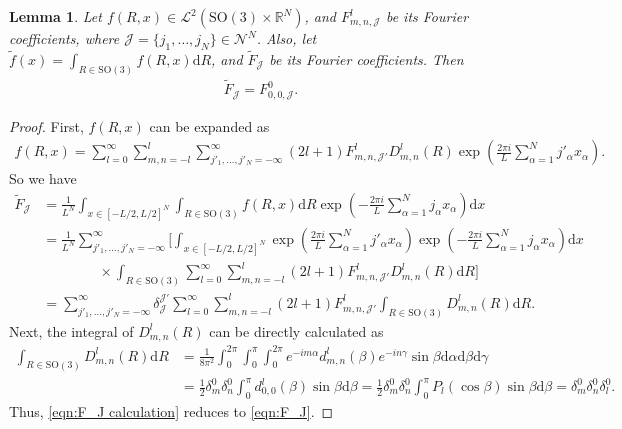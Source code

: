\documentclass[10pt]{article}
\newtheorem{lemma}{Lemma}
\newcommand{\SO}{\ensuremath{\mathrm{SO}(3)}}
\newcommand{\diff}[1]{\mathrm{d}#1}
\newcommand{\real}{\ensuremath{\mathbb{R}}}
\begin{document}
\begin{lemma} \label{lemma:marginal Fourier}
	Let $f(R,x)\in\mathcal{L}^2(\SO\times\real^N)$, and $F^l_{m,n,\mathcal{J}}$ be its Fourier coefficients, where $\mathcal{J} = \{j_1,\ldots,j_N\} \in \mathcal{N}^N$.
	Also, let $\tilde{f}(x) = \int_{R\in\SO} f(R,x) \diff{R}$, and $\tilde{F}_\mathcal{J}$ be its Fourier coefficients.
	Then
	\begin{align} \label{eqn:F_J}
		\tilde{F}_{\mathcal{J}} = F^0_{0,0,\mathcal{J}}.
	\end{align}
\end{lemma}
\begin{proof}
	First, $f(R,x)$ can be expanded as
	\begin{align*}
		f(R,x) = \sum_{l=0}^\infty \sum_{m,n=-l}^l \sum_{j'_1,\ldots,j'_N=-\infty}^\infty (2l+1) F^l_{m,n,\mathcal{J}'} D^l_{m,n}(R) \exp\left( \frac{2\pi i}{L} \sum_{\alpha=1}^N j'_\alpha x_\alpha \right).
	\end{align*}
	So we have
	\begin{align} \label{eqn:F_J calculation}
		\tilde{F}_\mathcal{J} &= \frac{1}{L^N} \int_{x\in[-L/2,L/2]^N} \int_{R\in\SO} f(R,x) \diff{R} \exp\left( -\frac{2\pi i}{L} \sum_{\alpha=1}^N j_\alpha x_\alpha \right) \diff{x} \nonumber \\
		&= \frac{1}{L^N} \sum_{j'_1,\ldots,j'_N=-\infty}^\infty \bigg[ \int_{x\in[-L/2,L/2]^N}  \exp\left( \frac{2\pi i}{L} \sum_{\alpha=1}^N j'_\alpha x_\alpha \right) \exp\left( -\frac{2\pi i}{L} \sum_{\alpha=1}^N j_\alpha x_\alpha \right) \diff{x} \nonumber \\
		&\qquad\qquad \times \int_{R\in\SO} \sum_{l=0}^{\infty} \sum_{m,n=-l}^l (2l+1)F^l_{m,n,\mathcal{J}'} D^l_{m,n}(R) \diff{R} \bigg] \nonumber \\
		&= \sum_{j'_1,\ldots,j'_N=-\infty}^\infty \delta_\mathcal{J}^{\mathcal{J}'} \sum_{l=0}^\infty \sum_{m,n=-l}^l (2l+1)F^l_{m,n,\mathcal{J}'} \int_{R\in\SO} D^l_{m,n}(R) \diff{R}.
	\end{align}
	Next, the integral of $D^l_{m,n}(R)$ can be directly calculated as
	\begin{align*}
		\int_{R\in\SO} D^l_{m,n}(R) \diff{R} &= \frac{1}{8\pi^2} \int_0^{2\pi} \int_0^\pi \int_0^{2\pi} e^{-im\alpha} d^l_{m,n}(\beta) e^{-in\gamma} \sin\beta \diff{\alpha} \diff{\beta} \diff{\gamma} \\
		&= \frac{1}{2} \delta_m^0 \delta_n^0 \int_0^\pi d^l_{0,0}(\beta) \sin\beta \diff{\beta} = \frac{1}{2} \delta_m^0 \delta_n^0 \int_0^\pi P_l(\cos\beta) \sin\beta \diff{\beta} = \delta_m^0 \delta_n^0 \delta_l^0.
	\end{align*}
	Thus, \eqref{eqn:F_J calculation} reduces to \eqref{eqn:F_J}.
\end{proof}
\end{document}
